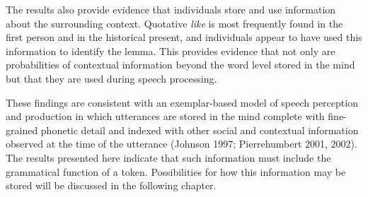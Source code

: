 The results also provide evidence that individuals store and use information about the surrounding context.  Quotative \textit{like} is most frequently found in the first person and in the historical present, and individuals appear to have used this information to identify the lemma.  This provides evidence that not only are probabilities of contextual information beyond the word level stored in the mind but that they are used during speech processing.  



These findings are consistent with an exemplar-based model of speech perception and production in which utterances are stored in the mind complete with fine-grained phonetic detail and indexed with other social and contextual information observed at the time of the utterance (Johnson 1997; Pierrehumbert 2001, 2002).  The results presented here indicate that such information must include the grammatical function of a token.  Possibilities for how this information may be stored will be discussed in the following chapter.





\newpage
\thispagestyle{empty}
\mbox{}